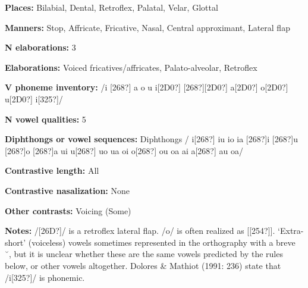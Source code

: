 \begin{styleBody}
\textbf{Places:} Bilabial, Dental, Retroflex, Palatal, Velar, Glottal
\end{styleBody}

\begin{styleBody}
\textbf{Manners:} Stop, Affricate, Fricative, Nasal, Central approximant, Lateral flap
\end{styleBody}

\begin{styleBody}
\textbf{N elaborations:} 3
\end{styleBody}

\begin{styleBody}
\textbf{Elaborations:} Voiced fricatives/affricates, Palato-alveolar, Retroflex
\end{styleBody}

\begin{styleBody}
\textbf{V phoneme inventory:} /i [268?] a o u i[2D0?] [268?][2D0?] a[2D0?] o[2D0?] u[2D0?] i[325?]/
\end{styleBody}

\begin{styleBody}
\textbf{N vowel qualities:} 5
\end{styleBody}

\begin{styleBody}
\textbf{Diphthongs or vowel sequences:} Diphthongs / i[268?] iu io ia [268?]i [268?]u [268?]o [268?]a ui u[268?] uo ua oi o[268?] ou oa ai a[268?] au oa/
\end{styleBody}

\begin{styleBody}
\textbf{Contrastive length:} All
\end{styleBody}

\begin{styleBody}
\textbf{Contrastive nasalization:} None
\end{styleBody}

\begin{styleBody}
\textbf{Other contrasts:} Voicing (Some)
\end{styleBody}

\begin{styleBody}
\textbf{Notes:} /[26D?]/ is a retroflex lateral flap. /o/ is often realized as [[254?]]. ‘Extra-short’ (voiceless) vowels sometimes represented in the orthography with a breve \ \u{ }, but it is unclear whether these are the same vowels predicted by the rules below, or other vowels altogether. Dolores \& Mathiot (1991: 236) state that /i[325?]/ is phonemic.
\end{styleBody}

